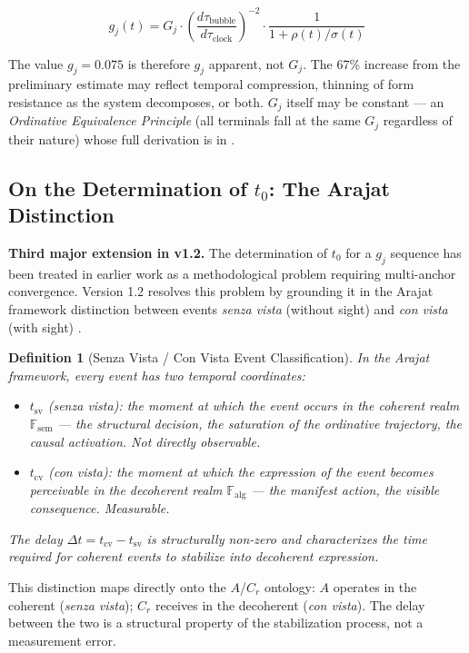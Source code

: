 \documentclass[12pt,a4paper]{article}
\newtheorem{definition}{Definition}[section]
\newcommand{\reag}{C_r}
\newcommand{\gj}{g_j}
\newcommand{\Mpot}{A}
\newcommand{\Fsem}{\mathbb{F}_{\mathrm{sem}}}
\newcommand{\Falg}{\mathbb{F}_{\mathrm{alg}}}
\begin{document}
\begin{equation}\label{eq:gj_apparent_full}
\gj(t) = G_j \cdot \left(\frac{d\tau_{\mathrm{bubble}}}{d\tau_{\mathrm{clock}}}\right)^{-2} \cdot \frac{1}{1 + \rho(t)/\sigma(t)}
\end{equation}

The value $\gj = 0.075$ is therefore $\gj$ apparent, not $G_j$. The 67\% increase from the preliminary estimate may reflect temporal compression, thinning of form resistance as the system decomposes, or both. $G_j$ itself may be constant --- an \emph{Ordinative Equivalence Principle} (all terminals fall at the same $G_j$ regardless of their nature) whose full derivation is in \cite{ghioni2026direction}.

\subsection{On the Determination of $t_0$: The Arajat Distinction}\label{subsec:arajat_t0}

\textbf{Third major extension in v1.2.} The determination of $t_0$ for a $\gj$ sequence has been treated in earlier work as a methodological problem requiring multi-anchor convergence. Version 1.2 resolves this problem by grounding it in the Arajat framework distinction between events \emph{senza vista} (without sight) and \emph{con vista} (with sight) \cite{arajat_codex}.

\begin{definition}[Senza Vista / Con Vista Event Classification]\label{def:senza_vista}
In the Arajat framework, every event has two temporal coordinates:
\begin{itemize}[leftmargin=2em]
    \item $t_{\mathrm{sv}}$ (\emph{senza vista}): the moment at which the event occurs in the coherent realm $\Fsem$ --- the structural decision, the saturation of the ordinative trajectory, the causal activation. Not directly observable.
    \item $t_{\mathrm{cv}}$ (\emph{con vista}): the moment at which the expression of the event becomes perceivable in the decoherent realm $\Falg$ --- the manifest action, the visible consequence. Measurable.
\end{itemize}
The delay $\Delta t = t_{\mathrm{cv}} - t_{\mathrm{sv}}$ is structurally non-zero and characterizes the time required for coherent events to stabilize into decoherent expression.
\end{definition}

This distinction maps directly onto the $\Mpot$/$\reag$ ontology: $\Mpot$ operates in the coherent (\emph{senza vista}); $\reag$ receives in the decoherent (\emph{con vista}). The delay between the two is a structural property of the stabilization process, not a measurement error.
\end{document}
